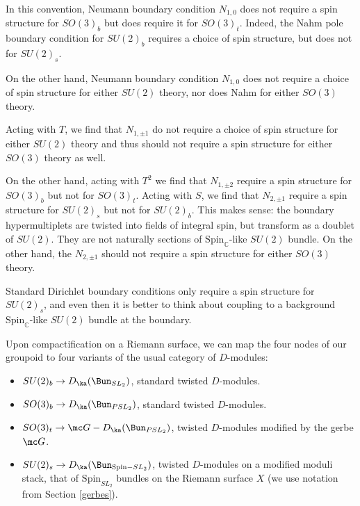 \documentclass[11pt,reqno]{amsart}
\theoremstyle{plain}
\numberwithin{equation}{section}
\newcommand{\C}{\mathbb{C}}
\theoremstyle{definition}
\begin{document}
In this convention, Neumann boundary condition $N_{1,0}$ does not require
a spin structure for $SO(3)_b$ but does require it for
$SO(3)_t$. Indeed, the Nahm pole boundary condition for $SU(2)_b$
requires a choice of spin structure, but does not for $SU(2)_s$.

On the other hand, Neumann boundary condition $N_{1,0}$ does not
require a choice of spin structure for either $SU(2)$ theory, nor does
Nahm for either $SO(3)$ theory.

Acting with $T$, we find that $N_{1,\pm 1}$ do not require a choice of
spin structure for either $SU(2)$ theory and thus should not require a
spin structure for either $SO(3)$ theory as well.

On the other hand, acting with $T^2$ we find that $N_{1,\pm 2}$
require a spin structure for $SO(3)_b$ but not for $SO(3)_t$.  Acting
with $S$, we find that $N_{2,\pm 1}$ require a
spin structure for $SU(2)_s$ but not for $SU(2)_b$.  This makes sense:
the boundary hypermultiplets are twisted into fields of integral spin,
but transform as a doublet of $SU(2)$.  They are not naturally
sections of $\mathrm{Spin}_\C$-like $SU(2)$ bundle. On the other hand,
the $N_{2,\pm 1}$ should not require a spin structure for either
$SO(3)$ theory.

Standard Dirichlet boundary conditions only require a spin structure
for $SU(2)_s$, and even then it is better to think about coupling to a
background $\mathrm{Spin}_\C$-like $SU(2)$ bundle at the boundary.

Upon compactification on a Riemann surface, we can map the four nodes
of our groupoid to four variants of the usual category of $D$-modules:

\medskip

\begin{itemize}
\item $SU(2)_b \to D_{\ka}(\Bun_{SL_2})$, standard twisted $D$-modules.

\medskip

\item $SO(3)_b \to D_{\ka}(\Bun_{PSL_2})$, standard twisted $D$-modules.

\medskip

\item $SO(3)_t \to {\mc G}-D_{\ka}(\Bun_{PSL_2})$, twisted $D$-modules
  modified by the gerbe ${\mc G}$.

\medskip

\item $SU(2)_s \to D_{\ka}(\Bun_{\mathrm{Spin}-SL_2})$, twisted $D$-modules on a
  modified moduli stack, that of $\mathrm{Spin}_{SL_2}$ bundles
  on the Riemann surface $X$ (we use notation from Section
  \ref{gerbes}).
\end{itemize}
\end{document}
